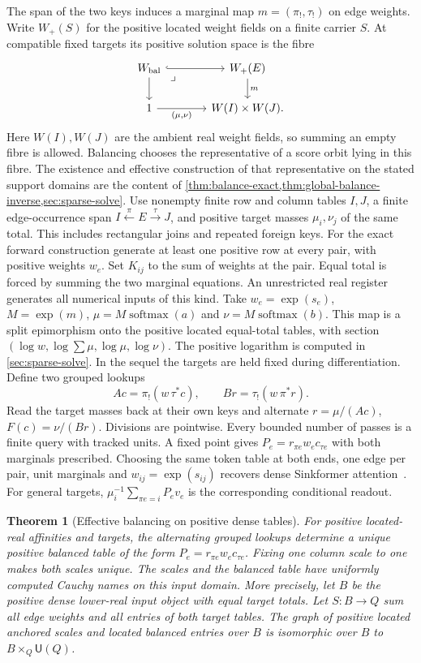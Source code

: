 \documentclass[11pt,a4paper]{article}
\newtheorem{theorem}{Theorem}[section]
\theoremstyle{definition}
\theoremstyle{remark}\newaliascnt{remark}{theorem}
\numberwithin{equation}{section}
\begin{document}
The span of the two keys induces a marginal map \(m=(\pi_!,\tau_!)\) on edge weights. Write \(W_+(S)\) for the positive located weight fields on a finite carrier \(S\). At compatible fixed targets its positive solution space is the fibre
\[
\begin{tikzcd}[column sep=large]
 W_{\rm bal}\arrow[r,hook]\arrow[d]\arrow[dr,phantom,"\lrcorner" very near start]&
 W_+(E)\arrow[d,"m"]\\
 1\arrow[r,"{(\mu,\nu)}"']&W(I)\times W(J).
\end{tikzcd}
\]
Here \(W(I),W(J)\) are the ambient real weight fields, so summing an empty fibre is allowed. Balancing chooses the representative of a score orbit lying in this fibre. The existence and effective construction of that representative on the stated support domains are the content of \cref{thm:balance-exact,thm:global-balance-inverse,sec:sparse-solve}.
Use nonempty finite row and column tables $I,J$, a finite edge-occurrence span $I\xleftarrow{\pi}E\xrightarrow{\tau}J$, and positive target masses $\mu_i,\nu_j$ of the same total. This includes rectangular joins and repeated foreign keys. For the exact forward construction generate at least one positive row at every pair, with positive weights $w_e$. Set $K_{ij}$ to the sum of weights at the pair. Equal total is forced by summing the two marginal equations. An unrestricted real register generates all numerical inputs of this kind. Take $w_e=\exp(s_e)$, $M=\exp(m)$, $\mu=M\operatorname{softmax}(a)$ and $\nu=M\operatorname{softmax}(b)$. This map is a split epimorphism onto the positive located equal-total tables, with section $(\log w,\log\sum\mu,\log\mu,\log\nu)$. The positive logarithm is computed in \cref{sec:sparse-solve}. In the sequel the targets are held fixed during differentiation. Define two grouped lookups
\[
 Ac=\pi_!(w\,\tau^*c),\qquad Br=\tau_!(w\,\pi^*r).
\]
Read the target masses back at their own keys and alternate $r=\mu/(Ac)$, $F(c)=\nu/(Br)$. Divisions are pointwise. Every bounded number of passes is a finite query with tracked units. A fixed point gives $P_e=r_{\pi e} w_e c_{\tau e}$ with both marginals prescribed. Choosing the same token table at both ends, one edge per pair, unit marginals and $w_{ij}=\exp(s_{ij})$ recovers dense Sinkformer attention~\cite{sink}. For general targets, $\mu_i^{-1}\sum_{\pi e=i}P_e v_e$ is the corresponding conditional readout.

\begin{theorem}[Effective balancing on positive dense tables]\label{thm:balance-exact}
For positive located-real affinities and targets, the alternating grouped lookups determine a unique positive balanced table of the form $P_e=r_{\pi e}w_e c_{\tau e}$. Fixing one column scale to one makes both scales unique. The scales and the balanced table have uniformly computed Cauchy names on this input domain. More precisely, let $B$ be the positive dense lower-real input object with equal target totals. Let $S:B\to Q$ sum all edge weights and all entries of both target tables. The graph of positive located anchored scales and located balanced entries over $B$ is isomorphic over $B$ to $B\times_Q\mathsf U(Q)$.
\end{theorem}
\end{document}
